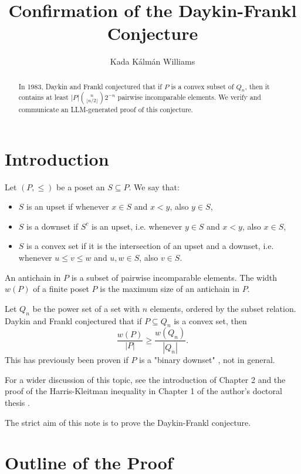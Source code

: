 \documentclass[12pt]{article}
\title{Confirmation of the Daykin-Frankl Conjecture}
\author{Kada Kálmán Williams}
\begin{document}
\maketitle

\begin{abstract}
In 1983, Daykin and Frankl conjectured that if $P$ is a convex subset of $Q_n$, then it contains at least $|P|\binom{n}{\lfloor n/2\rfloor}2^{-n}$ pairwise incomparable elements. We verify and communicate an LLM-generated proof of this conjecture.
\end{abstract}

\setlength{\baselineskip}{18pt}

\section{Introduction}

Let $(P,\le )$ be a poset an $S\subseteq P$. We say that:
\begin{itemize}
    \item $S$ is an upset if whenever $x\in S$ and $x<y$, also $y\in S$,
    \item $S$ is a downset if $S^c$ is an upset, i.e. whenever $y\in S$ and $x<y$, also $x\in S$,
    \item $S$ is a convex set if it is the intersection of an upset and a downset, i.e. whenever $u\le v\le w$ and $u,w\in S$, also $v\in S$.
\end{itemize}
An antichain in $P$ is a subset of pairwise incomparable elements. The width $w(P)$ of a finite poset $P$ is the maximum size of an antichain in $P$.

Let $Q_n$ be the power set of a set with $n$ elements, ordered by the subset relation. Daykin and Frankl \cite{DFr} conjectured that if $P\subseteq Q_n$ is a convex set, then
$$\frac{w(P)}{|P|}\ge \frac{w(Q_n)}{|Q_n|}.$$
This has previously been proven if $P$ is a "binary downset" \cite{DHL}, not in general.

For a wider discussion of this topic, see the introduction of Chapter 2 and the proof of the Harris-Kleitman inequality in Chapter 1 of the author's doctoral thesis \cite{Wil}.

The strict aim of this note is to prove the Daykin-Frankl conjecture.

\section{Outline of the Proof}
\end{document}
